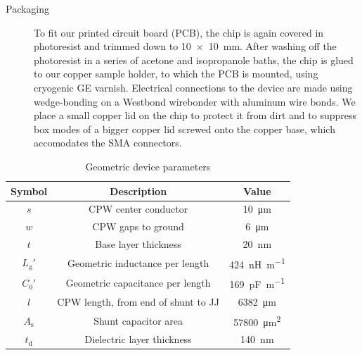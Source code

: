 \begin{description}
	\item[Packaging] To fit our printed circuit board (PCB), the chip is again covered in photoresist and trimmed down to \SI{10x10}{\milli\meter}.
	After washing off the photoresist in a series of acetone and isopropanole baths, the chip is glued to our copper sample holder, to which the PCB is mounted, using cryogenic GE varnish.
	Electrical connections to the device are made using wedge-bonding on a Westbond wirebonder with aluminum wire bonds.
	We place a small copper lid on the chip to protect it from dirt and to suppress box modes of a bigger copper lid screwed onto the copper base, which accomodates the SMA connectors.
\end{description}

\begin{table}
	\caption{Geometric device parameters\label{tab:geometry}}
	\begin{tabular}{ccc}
		\hline \hline
		Symbol       & Description                                                                 & Value                            \\
		\hline
		$s$          & CPW center conductor                                                        & \SI{10}{\micro\meter}            \\
		$w$          & CPW gaps to ground                                                          & \SI{6}{\micro\meter}             \\
		$t$          & Base layer thickness                                                        & \SI{20}{\nano\meter}             \\
		$L_\text{g}'$ & Geometric inductance per length \cite{simonsCoplanarWaveguideCircuits2001}  & \SI{424}{\nano\henry\per\meter}  \\
		$C_0'$ & Geometric capacitance per length \cite{simonsCoplanarWaveguideCircuits2001} & \SI{169}{\pico\farad\per\meter}  \\
		$l$          & CPW length, from end of shunt to JJ                                         & \SI{6382}{\micro\meter}          \\
		$A_\text{s}$        & Shunt capacitor area                                                        & \SI{57800}{\micro\meter\squared} \\
		$t_\text{d}$        & Dielectric layer thickness                                                  & \SI{140}{\nano\meter}            \\
		\hline\hline
	\end{tabular}
\end{table}

